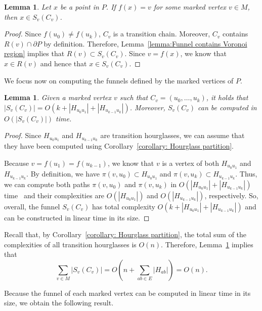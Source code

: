 \documentclass[a4paper]{article}
\newtheorem{lemma}[theorem]{Lemma}
\newcommand{\fn}[2]{\ensuremath{S_{\scriptscriptstyle #1}(#2)}}
\newcommand{\ff}[1]{\ensuremath{f(#1)}}
\newcommand{\p}[2]{\ensuremath{\pi(#1, #2)}}
\begin{document}
\begin{lemma}\label{lemma:Farthest points from marked are in funnel}
Let $x$ be a point in $P$. If $\ff{x} = v$ for some marked vertex $v\in M$, then $x\in \fn{v}{C_v}$.
\end{lemma}
\begin{proof}
Since $\ff{u_0} \neq \ff{u_k}$, $C_v$ is a transition chain. Moreover, $C_v$ contains $R(v)\cap \partial P$ by definition. Therefore, Lemma~\ref{lemma:Funnel contains Voronoi region} implies that $R(v)\subset \fn{v}{C_v}$.
Since $v = \ff{x}$, we know that $x\in R(v)$ and hence that $x \in \fn{v}{C_v}$. 
\end{proof}

We focus now on computing the funnels defined by the marked vertices of $P$.

\begin{lemma}\label{lemma: Computing a single funnel}
Given a marked vertex $v$ such that $C_v = (u_0, \ldots, u_k)$, it holds that $|\fn{v}{C_v}| = O(k + |H_{u_0 u_1}| + |H_{u_{k-1}u_k}|)$. Moreover, $\fn{v}{C_v}$ can be computed in $O(|\fn{v}{C_v}|)$ time.
\end{lemma}
\begin{proof}
Since $H_{u_0 u_1}$ and $H_{u_{k-1}u_k}$ are transition hourglasses, we can assume that they have been computed using Corollary~\ref{corollary: Hourglass partition}.

Because $v = \ff{u_1} = \ff{u_{k-1}}$, we know that $v$ is a vertex of both $H_{u_0 u_1}$ and  $H_{u_{k-1}u_k}$. 
By definition, we have $\p{v}{ u_0}\subset H_{u_0u_1}$ and $\p{v}{u_k}\subset H_{u_{k-1}u_k}$. Thus, we can compute both paths $\p{v}{ u_0}$ and $\p{v}{u_k}$ in $O( |H_{u_0 u_1}| + |H_{u_{k-1}u_k}|)$ time~\cite{guibasShortestPathTree} and their complexities are $O( |H_{u_0 u_1}|)$ and $O( |H_{u_{k-1}u_k}|)$, respectively.
So, overall, the funnel $\fn{v}{C_v}$ has total complexity $O(k + |H_{u_0 u_1}| + |H_{u_{k-1}u_k}|)$ and can be constructed in linear time in its size.
\end{proof}

Recall that, by Corollary~\ref{corollary: Hourglass partition}, the total sum of the complexities of all transition hourglasses is $O(n)$. Therefore, Lemma~\ref{lemma: Computing a single funnel} implies that 
$$\sum_{v\in M} |\fn{v}{C_v}|  = O\left(n + \sum_{ab\in E} |H_{ab}|\right) = O(n).$$

Because the funnel of each marked vertex can be computed in linear time in its size, we obtain the following result.
\end{document}
